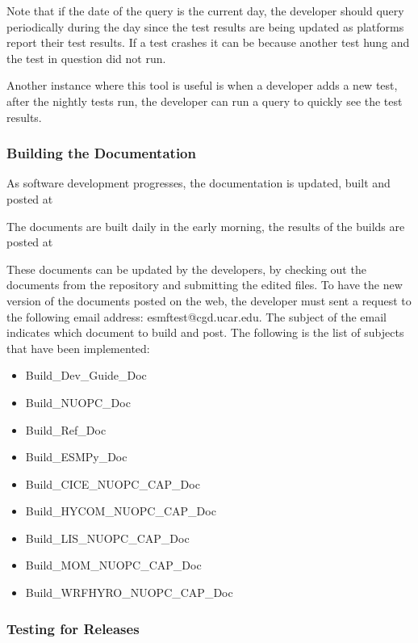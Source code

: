 Note that if the date of the query is the current day, the developer should query periodically during the day since
the test results are being updated as platforms report their test results.
If a test crashes it can be because another test hung and the test in question did not run.

Another instance where this tool is useful is when a developer adds a new test, after the nightly tests run, the developer can run a query to quickly see the test results.

\subsubsection{Building the Documentation}

As software development progresses, the documentation is updated, built and posted at

The documents are built daily in the early morning, the results of the builds are posted at

These documents can be updated by the developers, by checking out the documents from the repository and submitting the edited files. To have the new version of the documents posted on the web, the developer must sent a request to the following email address: esmftest@cgd.ucar.edu. The subject of the email indicates which document to build and post.
The following is the list of subjects that have been implemented:

\begin{itemize} 
\item Build\_Dev\_Guide\_Doc
\item Build\_NUOPC\_Doc
\item Build\_Ref\_Doc
\item Build\_ESMPy\_Doc
\item Build\_CICE\_NUOPC\_CAP\_Doc
\item Build\_HYCOM\_NUOPC\_CAP\_Doc
\item Build\_LIS\_NUOPC\_CAP\_Doc
\item Build\_MOM\_NUOPC\_CAP\_Doc
\item Build\_WRFHYRO\_NUOPC\_CAP\_Doc
\end{itemize}

\subsubsection{Testing for Releases}

